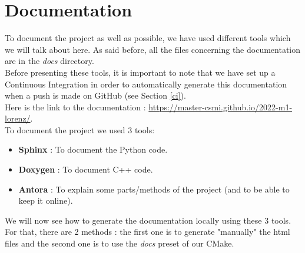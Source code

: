 \newpage

\section{Documentation}
\label{doc}

	To document the project as well as possible, we have used different tools which we will talk about here. As said before, all the files concerning the documentation are in the \textit{docs} directory. \\
	Before presenting these tools, it is important to note that we have set up a Continuous Integration in order to automatically generate this documentation when a push is made on GitHub (see Section \ref{ci}). \\
	Here is the link to the documentation : \url{https://master-csmi.github.io/2022-m1-lorenz/}. \\
	To document the project we used 3 tools:
	\begin{itemize}[label=-]
		\item \textbf{Sphinx\cite{sphinx_doc}} : To document the Python code. 
		\item \textbf{Doxygen\cite{doxygen_doc}} : To document C++ code.
		\item \textbf{Antora\cite{antora_doc}} : To explain some parts/methods of the project (and to be able to keep it online).
	\end{itemize}
	We will now see how to generate the documentation locally using these 3 tools. For that, there are 2 methods : the first one is to generate "manually" the html files and the second one is to use the \textit{docs} preset of our CMake.
